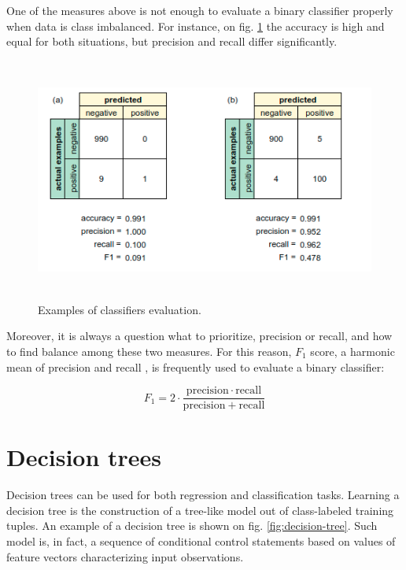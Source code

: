 One of the measures above is not enough to evaluate a binary classifier properly when data is class imbalanced. For instance, on fig. \ref{fig:classifiers-evaluation} the accuracy is high and equal for both situations, but precision and recall differ significantly. 

\begin{figure}[h]
    \centering
    \includegraphics[height=8cm]{Images/Classifiers-evaluation.png}
    \caption{Examples of classifiers evaluation.}
    \label{fig:classifiers-evaluation}
\end{figure}

Moreover, it is always a question what to prioritize, precision or recall, and how to find balance among these two measures. For this reason, $F_1$ score, a harmonic mean of precision and recall \citep{Chinchor-1992}, is frequently used to evaluate a binary classifier:

\begin{equation}
    F_{1}=2\cdot {\frac {\mathrm {precision} \cdot \mathrm {recall} }{\mathrm {precision} +\mathrm {recall} }}
\end{equation} 

\section{Decision trees}
Decision trees can be used for both regression and classification tasks. Learning a decision tree is the construction of a tree-like model out of class-labeled training tuples. An example of a decision tree is shown on fig. \ref{fig:decision-tree}. Such model is, in fact, a sequence of conditional control statements based on values of feature vectors characterizing input observations. 

